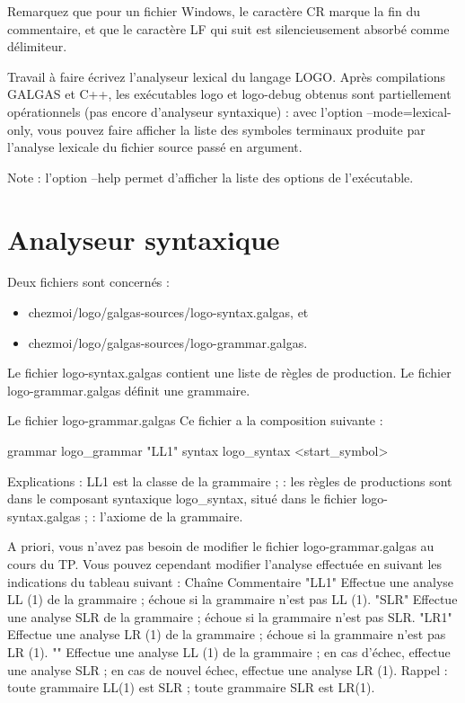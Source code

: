 Remarquez que pour un fichier Windows, le caractère CR marque la fin du commentaire, et que le caractère LF qui suit est silencieusement absorbé comme délimiteur.

Travail à faire
écrivez l'analyseur lexical du langage LOGO. Après compilations GALGAS et C++, les exécutables logo et logo-debug obtenus sont partiellement opérationnels (pas encore d’analyseur syntaxique) : avec l'option --mode=lexical-only, vous pouvez faire afficher la liste des symboles terminaux produite par l'analyse lexicale du fichier source passé en argument.

Note : l'option --help permet d'afficher la liste des options de l'exécutable. 

\section{Analyseur syntaxique}

Deux fichiers sont concernés :
\begin{itemize}
  \item chezmoi/logo/galgas-sources/logo-syntax.galgas, et
  \item chezmoi/logo/galgas-sources/logo-grammar.galgas.
\end{itemize}

Le fichier logo-syntax.galgas contient une liste de règles de production. Le fichier logo-grammar.galgas définit une grammaire.

Le fichier logo-grammar.galgas
Ce fichier a la composition suivante :

\begin{galgascode}
grammar logo_grammar "LL1" {
  syntax logo_syntax
  <start_symbol>
}
\end{galgascode}

Explications :
LL1 est la classe de la grammaire ;
 : les règles de productions sont dans le composant syntaxique logo\_syntax, situé dans le fichier logo-syntax.galgas ; 
 : l'axiome de la grammaire.

A priori, vous n'avez pas besoin de modifier le fichier logo-grammar.galgas au cours du TP. Vous pouvez cependant modifier l'analyse effectuée en suivant les indications du tableau suivant :
Chaîne	Commentaire
"LL1"	Effectue une analyse LL (1) de la grammaire ; échoue si la grammaire n'est pas LL (1).
"SLR"	Effectue une analyse SLR de la grammaire ; échoue si la grammaire n'est pas SLR.
"LR1"	Effectue une analyse LR (1) de la grammaire ; échoue si la grammaire n'est pas LR (1).
""	Effectue une analyse LL (1) de la grammaire ; en cas d'échec, effectue une analyse SLR ; en cas de nouvel échec, effectue une analyse LR (1). 
Rappel :
toute grammaire LL(1) est SLR ;
toute grammaire SLR est LR(1).

